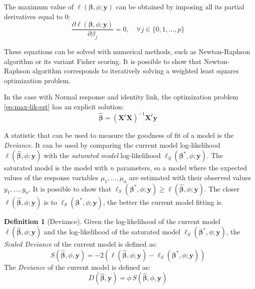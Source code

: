 \documentclass[a4paper, twoside, openright, 12pt]{report}
\theoremstyle{definition}
\newtheorem{definition}{Definition}[chapter]
\theoremstyle{definition}
\theoremstyle{definition}
\theoremstyle{remark}
\begin{document}
The maximum value of \(\ell\left(\boldsymbol{\beta}, \phi; \boldsymbol{y}\right)\) can be obtained by imposing all its partial derivatives equal to \(0\):
\[
\frac{\partial \ell\left(\boldsymbol{\beta}, \phi; \boldsymbol{y}\right)}
{\partial\beta_j}
= 0, \quad \forall j\in\{0,1,\dots,p\}
\]

These equations can be solved with numerical methods, such as Newton-Raphson algorithm or its variant Fisher scoring. It is possible to show that Newton-Raphson algorithm corresponds to iteratively solving a weighted least squares optimization problem.

In the case with Normal response and identity link, the optimization problem \eqref{eq:max-lik-est} has an explicit solution:
\[
\hat{\boldsymbol{\beta}} = \left( \boldsymbol{X}^t \boldsymbol{X} \right)^{-1} \boldsymbol{X}^t \boldsymbol{y}
\]

A statistic that can be used to measure the goodness of fit of a model is the \emph{Deviance}. It can be used by comparing the current model log-likelihood \(\ell\left(\hat{\boldsymbol{\beta}}, \phi; \boldsymbol{y}\right)\) with the \emph{saturated model} log-likelihood \(\ell_{S}\left(\boldsymbol{\beta}^*, \phi; \boldsymbol{y}\right)\). The saturated model is the model with \(n\) parameters, so a model where the expected values of the response variables \(\mu_1, \dots, \mu_n\) are estimated with their observed values \(y_1, \dots, y_n\). It is possible to show that \(\ell_{S}\left(\boldsymbol{\beta}^*, \phi; \boldsymbol{y}\right) \ge \ell\left(\hat{\boldsymbol{\beta}}, \phi; \boldsymbol{y}\right)\). The closer \(\ell\left(\hat{\boldsymbol{\beta}}, \phi; \boldsymbol{y}\right)\) is to \(\ell_{S}\left(\boldsymbol{\beta}^*, \phi; \boldsymbol{y}\right)\), the better the current model fitting is.

\begin{definition}[Deviance]
\label{def:deviance-def} \iffalse (Deviance) \fi{} Given the log-likelihood of the current model \(\ell\left(\hat{\boldsymbol{\beta}}, \phi; \boldsymbol{y}\right)\) and the log-likelihood of the saturated model \(\ell_{S}\left(\boldsymbol{\beta}^*, \phi; \boldsymbol{y}\right)\), the \textit{Scaled Deviance} of the current model is defined as:
\[
S(\hat{\boldsymbol{\beta}}, \phi, \boldsymbol{y}) =
-2\left(
\ell\left(\hat{\boldsymbol{\beta}}, \phi; \boldsymbol{y}\right)
- \ell_{S}\left(\boldsymbol{\beta}^*, \phi; \boldsymbol{y}\right)
\right)
\]
The \textit{Deviance} of the current model is defined as:
\[
D(\hat{\boldsymbol{\beta}}, \boldsymbol{y}) =
\phi \, S(\hat{\boldsymbol{\beta}}, \phi, \boldsymbol{y})
\]
\end{definition}
\end{document}
